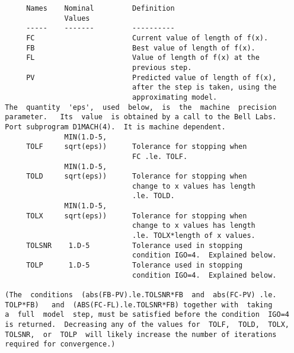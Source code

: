 \begin{verbatim}
       Names    Nominal         Definition
                Values
       -----    -------         ----------
       FC                       Current value of length of f(x).
       FB                       Best value of length of f(x).
       FL                       Value of length of f(x) at the
                                previous step.
       PV                       Predicted value of length of f(x),
                                after the step is taken, using the
                                approximating model.
  The  quantity  'eps',  used  below,  is  the  machine  precision
  parameter.   Its  value  is obtained by a call to the Bell Labs.
  Port subprogram D1MACH(4).  It is machine dependent.
                MIN(1.D-5,
       TOLF     sqrt(eps))      Tolerance for stopping when
                                FC .le. TOLF.
                MIN(1.D-5,
       TOLD     sqrt(eps))      Tolerance for stopping when
                                change to x values has length
                                .le. TOLD.
                MIN(1.D-5,
       TOLX     sqrt(eps))      Tolerance for stopping when
                                change to x values has length
                                .le. TOLX*length of x values.
       TOLSNR    1.D-5          Tolerance used in stopping
                                condition IGO=4.  Explained below.
       TOLP      1.D-5          Tolerance used in stopping
                                condition IGO=4.  Explained below.

  (The  conditions  (abs(FB-PV).le.TOLSNR*FB  and  abs(FC-PV) .le.
  TOLP*FB)   and  (ABS(FC-FL).le.TOLSNR*FB) together with  taking
  a  full  model  step, must be satisfied before the condition  IGO=4
  is returned.  Decreasing any of the values for  TOLF,  TOLD,  TOLX,
  TOLSNR,  or  TOLP  will likely increase the number of iterations
  required for convergence.)


\end{verbatim}
